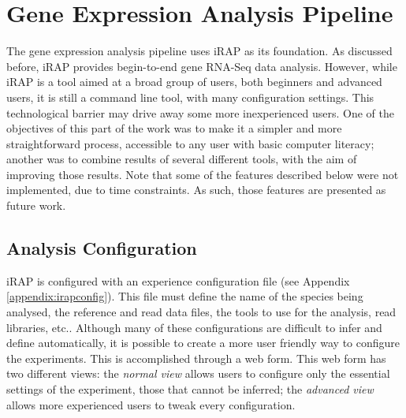 \section{Gene Expression Analysis Pipeline}


The gene expression analysis pipeline uses iRAP \cite{irap} as its foundation.
As discussed before, iRAP provides begin-to-end gene RNA-Seq data analysis.
However, while iRAP is a tool aimed at a broad group of users, both beginners
and advanced users, it is still a command line tool, with many configuration
settings. This technological barrier may drive away some more inexperienced
users. One of the objectives of this part of the work was to make it a simpler
and more straightforward process, accessible to any user with basic computer
literacy; another was to combine results of several different tools, with the
aim of improving those results. Note that some of the features described below
were not implemented, due to time constraints. As such, those features are
presented as future work.

\subsection{Analysis Configuration}

iRAP is configured with an experience configuration file (see Appendix
\ref{appendix:irapconfig}). This file must define the name of the species being
analysed, the reference and read data files, the tools to use for the analysis,
read libraries, etc.. Although many of these configurations are difficult to
infer and define automatically, it is possible to create a more user friendly
way to configure the experiments. This is accomplished through a web form. This
web form has two different views: the \emph{normal view} allows users to
configure only the essential settings of the experiment, those that cannot be
inferred; the \emph{advanced view} allows more experienced users to tweak every
configuration.

